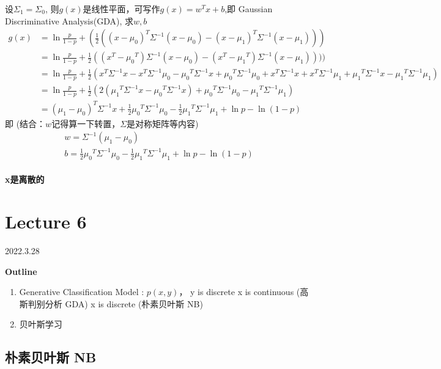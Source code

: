 \documentclass[UTF8]{ctexart}
\numberwithin{equation}{section}
\begin{document}
设$ \Sigma_1=\Sigma_0 $, 则$g(x)$是线性平面，可写作$g(x) = w^Tx+b$,即 Gaussian Discriminative Analysis(GDA),
求$w, b$
\begin{equation*}
    \begin{aligned}
        g(x) &= \ln{\frac{p}{1-p}} + (\frac{1}{2}((x-\mu_0)^T\Sigma^{-1}(x-\mu_0)-(x-\mu_1)^T\Sigma^{-1}(x-\mu_1))) \\
        & = \ln{\frac{p}{1-p}} + \frac{1}{2}((x^T-{\mu_0}^T)\Sigma^{-1}(x-\mu_0) - (x^T-{\mu_1}^T)\Sigma^{-1}(x-\mu_1))))\\
        &= \ln{\frac{p}{1-p}} + \frac{1}{2}(x^T \Sigma^{-1}x - x^T\Sigma^{-1}\mu_0 - {\mu_0}^T\Sigma^{-1}x + {\mu_0}^T\Sigma^{-1}\mu_0 + x^T \Sigma^{-1}x + x^T\Sigma^{-1}\mu_1 + {\mu_1}^T\Sigma^{-1}x - {\mu_1}^T\Sigma^{-1}\mu_1) \\
        &= \ln{\frac{p}{1-p}} + \frac{1}{2}(2({\mu_1}^T \Sigma^{-1}x - {\mu_0}^T \Sigma^{-1}x) + {\mu_0}^T\Sigma^{-1}\mu_0 - {\mu_1}^T\Sigma^{-1}\mu_1) \\
        &= ({{\mu_1}-{\mu_0}})^T\Sigma^{-1}x + \frac{1}{2}{\mu_0}^T\Sigma^{-1}\mu_0 - \frac{1}{2}{\mu_1}^T\Sigma^{-1}\mu_1 + \ln p - \ln{(1-p)} 
    \end{aligned}
\end{equation*}
即 (结合：$w$记得算一下转置，$\Sigma$是对称矩阵等内容)
\begin{gather*}
    w = \Sigma^{-1}({{\mu_1}-{\mu_0}})\\
    b = \frac{1}{2}{\mu_0}^T\Sigma^{-1}\mu_0 - \frac{1}{2}{\mu_1}^T\Sigma^{-1}\mu_1 + \ln p - \ln{(1-p)}  
\end{gather*}

\paragraph*{x是离散的}

\newpage
\section{Lecture 6}
2022.3.28


\textbf{Outline}
\begin{enumerate}
    \item Generative Classification Model : $p(x,y)$， y is discrete
        \subitem x is continuous (高斯判别分析 GDA)
        \subitem x is discrete (朴素贝叶斯 NB)
    \item 贝叶斯学习
\end{enumerate}

\subsection{朴素贝叶斯 NB}
\dotfill
\end{document}
